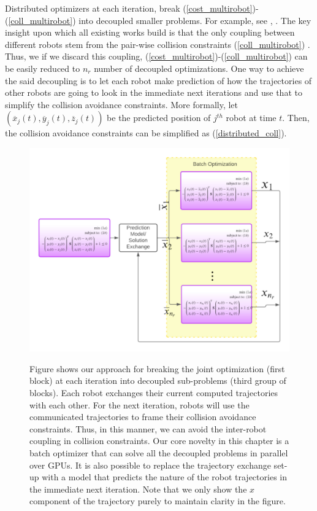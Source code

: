 Distributed optimizers at each iteration, break (\ref{cost_multirobot})-(\ref{coll_multirobot}) into decoupled smaller problems. For example, see \citep{alonso_mora_nips_multi}, \citep{multi_robot_1}. The key insight upon which all existing works build is that the only coupling between different robots stem from the pair-wise collision constraints (\ref{coll_multirobot}) \citep{multi_robot_1}. Thus, we if we discard this coupling, (\ref{cost_multirobot})-(\ref{coll_multirobot}) can be easily reduced to $n_r$ number of decoupled optimizations. One way to achieve the said decoupling is to let each robot make prediction of how the trajectories of other robots are going to look in the immediate next iterations and use that to simplify the collision avoidance constraints. More formally, let $(\overline{x}_j(t), \overline{y}_j(t), \overline{z}_j(t) )$ be the predicted position of $j^{th}$ robot at time $t$. Then, the collision avoidance constraints can be simplified as (\ref{distributed_coll}). 


\begin{figure}
    \centering
    {\includegraphics{figures/gpu_mat/pipeline.jpg}} 
    \caption[GPU multi-robot optimizer pipeline]{ Figure shows our approach for breaking the joint optimization (first block) at each iteration into decoupled sub-problems (third group of blocks). Each robot exchanges their current computed trajectories with each other. For the next iteration, robots will use the communicated trajectories to frame their collision avoidance constraints. Thus, in this manner, we can avoid the inter-robot coupling in collision constraints. Our core novelty in this chapter is a batch optimizer that can solve all the decoupled problems in parallel over GPUs. It is also possible to replace the trajectory exchange set-up with a model that predicts the nature of the robot trajectories in the immediate next iteration. Note that we only show the $x$ component of the trajectory purely to maintain clarity in the figure.}
    \label{fig: figure_block_diagram}
\end{figure}

